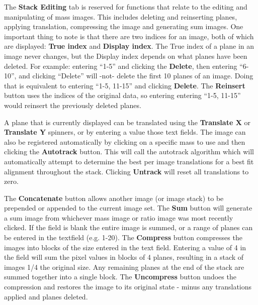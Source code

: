 \documentclass{article}
\begin{document}
	The \textbf{Stack Editing} tab is reserved for functions that relate to the editing
	and manipulating of mass images. This includes deleting and reinserting planes,
	applying translation, compressing the image and generating sum images. 
	One important thing to note is that there
	are two indices for an image, both of which are displayed: \textbf{True index} and 
	\textbf{Display index}. The True index of a
	plane in an image never changes, but the Display index depends on what planes have been deleted. For
	example: entering “1-5” and clicking the \textbf{Delete}, then entering “6-10”, 
	and clicking “Delete” will -not- delete the first 10
	planes of an image. Doing that is equivalent to entering “1-5, 11-15” and clicking \textbf{Delete}. 
	The \textbf{Reinsert} button uses the indices of the original data, so entering
	entering “1-5, 11-15” would reinsert the previously deleted planes.
	
	A plane that is currently displayed can be translated using 
	the \textbf{Translate X} or \textbf{Translate Y} spinners, or by
	entering a value those text fields. The image can also be 
	registered automatically by clicking on a specific mass
	to use and then clicking the \textbf{Autotrack} button. 
	This will call the autotrack algorithm 
	which will automatically attempt to determine the best 
	per image translations for a best fit alignment
	throughout the stack. Clicking \textbf{Untrack} will 
	reset all translations to zero.

	The \textbf{Concatenate} button allows another image (or image stack) to be
	prepended or appended to the current image set. The \textbf{Sum} button will 
	generate a sum image from whichever mass image or ratio
	image was most recently clicked. If the field is blank the entire image is summed, 
	or a range of planes can be entered in the textfield (e.g. 1-20). The \textbf{Compress} button 
	compresses the images into blocks of the size entered in the text field. Entering 
	a value of 4 in the field will sum the pixel values in blocks of 4 planes,
	resulting in a stack of images 1/4 the original size. Any
	remaining planes at the end of the stack are summed together into a single block.
	The \textbf{Uncompress} button undoes the compression and restores the image to its original
	state - minus any translations applied and planes deleted.

\end{document}
